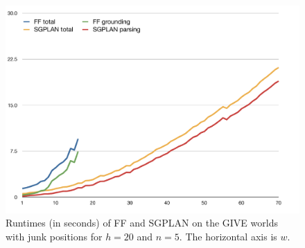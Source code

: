 \begin{figure}
  \centering
  \includegraphics[width=1\columnwidth]{pic-runtime-empty-world}
  \caption{Runtimes (in seconds) of FF and SGPLAN on the GIVE worlds with junk
    positions for $h=20$ and $n=5$. The horizontal axis is $w$.}
  \label{fig:give-runtime-junk}
\end{figure}


